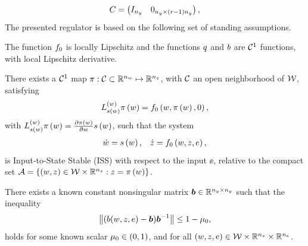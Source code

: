 \begin{equation*}
   C =
   \begin{pmatrix}
      I_{n_{y}} & 0_{n_{y} \times (r-1)n_{y}}
   \end{pmatrix},
\end{equation*}
The presented regulator is based on the following set of standing assumptions.
\begin{assumption}%
	\label{ASSUM:CONTINUITY-ASSUMPTION}
   The function $f_0$ is locally Lipschitz and the functions $q$ and $b$ are $\mathcal{C}^1$ functions, with local Lipschitz derivative.
\end{assumption}
\begin{assumption}%
	\label{ASSUM:REGULATOR-EQUATIONS}
   There exists a $\mathcal{C}^1$ map $\pi: \mathcal{C} \subset \mathbb{R}^{n_{w}} \mapsto \mathbb{R}^{n_{z}}$, with $\mathcal{C}$ an open neighborhood of $\mathcal{W}$, satisfying
   \begin{equation*}
      L_{s \left( w \right)}^{\left( w \right)} \pi \left( w \right) = f_0 \left( w, \pi \left( w \right), 0 \right),
   \end{equation*} 
   with $L_{s \left( w \right)}^{\left( w \right)} \pi \left( w \right) = \frac{\partial \pi \left( w \right)}{\partial w} s \left( w \right)$,
   such that the system
   \begin{equation*}
      \begin{matrix}
         \dot{w} = s \left( w \right), & \dot{z} = f_0 \left( w, z, e \right),
      \end{matrix}
   \end{equation*}
   is Input-to-State Stable (ISS) with respect to the input $\ee$,
   relative to the compact set $\mathcal{A} = \left\{ \left( w, z \right) \in \mathcal{W} \times \mathbb{R}^{n_{z}} : z = \pi \left( w \right) \right\}$.
\end{assumption}
\begin{assumption}%
   \label{ASSUM:STABILIZABILITY-ASSUMPTION}
   There exists a known constant nonsingular matrix $\boldsymbol{b} \in \mathbb{R}^{n_{y} \times n_{y}}$ such that the inequality
   \begin{equation*}
    	\left \lVert {(b(w, z, e) - \boldsymbol{b})\boldsymbol{b}^{-1}} \right \rVert \le 1 - \mu_0,
   \end{equation*}
   holds for some known scalar $\mu_0 \in \left( 0, 1 \right)$, and for all
   $\left( w, z, e \right) \in \mathcal{W} \times \mathbb{R}^{n_{z}} \times \mathbb{R}^{n_{e}}$.
\end{assumption}
